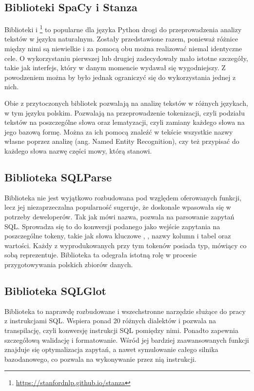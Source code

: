 \subsection{Biblioteki SpaCy i Stanza}
Biblioteki  i \footnote{\url{https://stanfordnlp.github.io/stanza}} to popularne dla języka Python drogi do przeprowadzenia analizy tekstów w języku naturalnym. Zostały przedstawione razem, ponieważ różnice między nimi są niewielkie i za pomocą obu można realizować niemal identyczne cele. O wykorzystaniu pierwszej lub drugiej zadecydowały mało istotne szczegóły, takie jak interfejs, który w danym momencie wydawał się wygodniejszy. Z powodzeniem można by było jednak ograniczyć się do wykorzystania jednej z nich.

Obie z przytoczonych bibliotek pozwalają na analizę tekstów w różnych językach, w tym języku polskim. Pozwalają na przeprowadzenie tokenizacji, czyli podziału tekstów na poszczególne słowa oraz lematyzacji, czyli zamiany każdego słowa na jego bazową formę. Można za ich pomocą znaleźć w tekście wszystkie nazwy własne poprzez analizę  (ang. Named Entity Recognition), czy też przypisać do każdego słowa nazwę części mowy, którą stanowi. 

\subsection{Biblioteka SQLParse}
Biblioteka  nie jest wyjątkowo rozbudowana pod względem oferowanych funkcji, lecz jej niezaprzeczalna popularność sugeruje, że doskonale wpasowała się w potrzeby deweloperów. Tak jak mówi nazwa,  pozwala na parsowanie zapytań SQL. Sprowadza się to do konwersji podanego jako wejście zapytania na poszczególne tokeny, takie jak słowa kluczowe , , nazwy kolumn i tabel oraz wartości. Każdy z wyprodukowanych przy tym tokenów posiada typ, mówiący co sobą reprezentuje. Biblioteka ta odegrała istotną rolę w procesie przygotowywania polskich zbiorów danych.

\subsection{Biblioteka SQLGlot}
Biblioteka  to naprawdę rozbudowane i wszechstronne narzędzie służące do pracy z instrukcjami SQL. Wspiera ponad 20 różnych dialektów i pozwala na transpilację, czyli konwersję instrukcji SQL pomiędzy nimi. Ponadto zapewnia szczegółową walidację i formatowanie. Wśród jej bardziej zaawansowanych funkcji znajduje się optymalizacja zapytań, a nawet symulowanie całego silnika bazodanowego, co pozwala na wykonywanie przez nią instrukcji.

